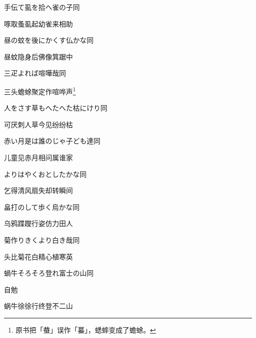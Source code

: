 \begin{haiku}
    {\FH 手伝て虱を拾へ雀の子}\hfill{\FH 同}

    {\FK 啄取蚤虱起幼雀来相助}
\end{haiku}

\begin{haiku}
    {\FH 昼の蚊を後にかくす仏かな}\hfill{\FH 同}

    {\FK 昼蚊隐身后佛像箕踞中}
\end{haiku}

\begin{haiku}
    {\FH {}三疋よれば喧嘩哉}\hfill{\FH 同}

    {\FK 三头蟾蜍聚定作喧哗声\footnote{\FT 原书把「蛬」误作「蟇」，蟋蟀变成了蟾蜍。}}
\end{haiku}

\begin{haiku}
    {\FH 人をさす草もへたへた枯にけり}\hfill{\FH 同}

    {\FK 可厌刺人草今见纷纷枯}
\end{haiku}

\begin{haiku}
    {\FH 赤い月是は誰のじゃ子ども達}\hfill{\FH 同}

    {\FK 儿童见赤月相问属谁家}
\end{haiku}

\begin{haiku}
    {\FH {}よりはやくおとしたかな}\hfill{\FH 同}

    {\FK 乞得清风扇失却转瞬间}
\end{haiku}

\begin{haiku}
    {\FH 畠打のして歩く烏かな}\hfill{\FH 同}

    {\FK 乌鸦蹀躞行姿仿力田人}
\end{haiku}

\begin{haiku}
    {\FH 菊作りきくより白き哉}\hfill{\FH 同}

    {\FK 头比菊花白精心植寒英}
\end{haiku}

\begin{haiku}
    {\FH 蝸牛そろそろ登れ富士の山}\hfill{\FH 同}

    {\FK 自勉}

    {\FK 蜗牛徐徐行终登不二山}
\end{haiku}

